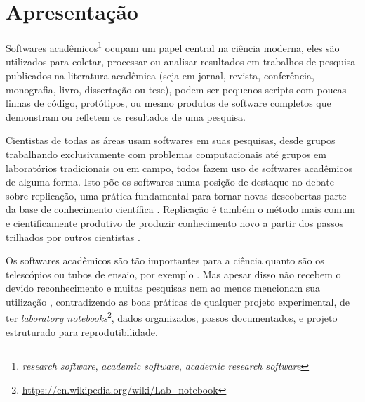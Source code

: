 
\section{Apresentação}

Softwares acadêmicos\footnote{{\it research software}, {\it academic software},
{\it academic research software}} ocupam um papel central na ciência moderna,
eles são utilizados para coletar, processar ou analisar resultados em trabalhos
de pesquisa publicados na literatura acadêmica (seja em jornal, revista,
conferência, monografia, livro, dissertação ou tese), podem ser pequenos
scripts com poucas linhas de código, protótipos, ou mesmo produtos de software
completos que demonstram ou refletem os resultados de uma pesquisa.


Cientistas de todas as áreas usam softwares em suas pesquisas, desde grupos
trabalhando exclusivamente com problemas computacionais até grupos em
laboratórios tradicionais ou em campo, todos fazem uso de softwares acadêmicos
de alguma forma. Isto põe os softwares numa posição de destaque no debate sobre
replicação, uma prática fundamental para tornar novas descobertas parte da base
de conhecimento científica \cite{Stodden2009}.  Replicação é também o método
mais comum e cientificamente produtivo de produzir conhecimento novo a partir
dos passos trilhados por outros cientistas \cite{king1995replication}.


Os softwares acadêmicos são tão importantes para a ciência quanto são os
telescópios ou tubos de ensaio, por exemplo \cite{wilson2014best}.  Mas apesar
disso não recebem o devido reconhecimento e muitas pesquisas nem ao menos
mencionam sua utilização \cite{howison2016software}, contradizendo as boas
práticas de qualquer projeto experimental, de ter {\it laboratory
notebooks}\footnote{\url{https://en.wikipedia.org/wiki/Lab_notebook}}, dados
organizados, passos documentados, e projeto estruturado para reprodutibilidade.


%
%
%

